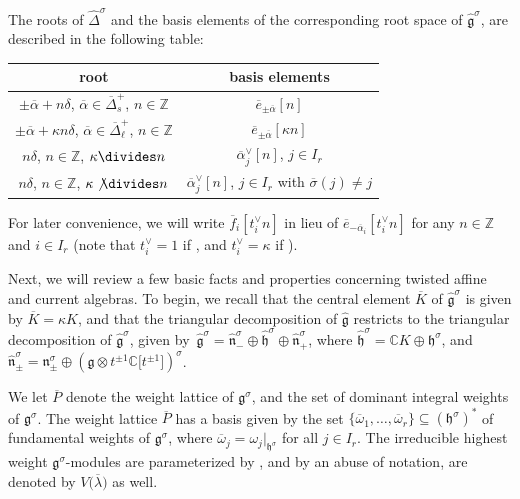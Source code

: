 \documentclass[pdftex]{sigma}
\numberwithin{equation}{section}
\begin{document}
The roots of $\widehat{\Delta}^{\sigma}$ and the basis elements of the corresponding root space of $\widehat{\mathfrak{g}}^{\sigma}$, are described in the following table:
\begin{center}\renewcommand{\arraystretch}{1.2}
 \begin{tabular}{|c|c|}
 \hline
 root & basis elements \\ \hline
 $\pm\overline{\alpha}+n\delta$, $\overline{\alpha}\in\overline{\Delta}_s^+$, $n\in\mathbb{Z}$ & $\overline{e}_{\pm\overline{\alpha}}[n]$ \\ \hline
 $\pm\overline{\alpha}+\kappa n\delta$, $\overline{\alpha}\in\overline{\Delta}_{\ell}^+$, $n\in\mathbb{Z}$ & $\overline{e}_{\pm\overline{\alpha}}[\kappa n]$ \\ \hline
 $n\delta$, $n\in\mathbb{Z}$, $\kappa\divides n$ & $\overline{\alpha}_j^{\vee}[n]$, $j\in I_r$ \\ \hline
 $n\delta$, $n\in\mathbb{Z}$, $\kappa\not\divides n$ & $\overline{\alpha}_j^{\vee}[n]$, $j\in I_r$ with $\overline{\sigma}(j)\neq j$ \\
 \hline
 \end{tabular}
\end{center}
For later convenience, we will write $\overline{f}_i[t_i^{\vee}n]$ in lieu of $\overline{e}_{-\overline{\alpha}_i}[t_i^{\vee}n]$ for any $n\in\mathbb{Z}$ and $i\in I_r$ \big(note that $t_i^{\vee}=1$ if , and $t_i^{\vee}=\kappa$ if \big).

Next, we will review a few basic facts and properties concerning twisted affine and current algebras. To begin, we recall that the central element $\overline{K}$ of $\widehat{\mathfrak{g}}^{\sigma}$ is given by $\overline{K}=\kappa K$, and that the triangular decomposition of $\widehat{\mathfrak{g}}$ restricts to the triangular decomposition of $\widehat{\mathfrak{g}}^{\sigma}$, given by~${\widehat{\mathfrak{g}}^{\sigma}=\widehat{\mathfrak{n}}_-^{\sigma}\oplus \widehat{\mathfrak{h}}^{\sigma}\oplus \widehat{\mathfrak{n}}_+^{\sigma}}$, where $\widehat{\mathfrak{h}}^{\sigma}= \mathbb{C}K\oplus\mathfrak{h}^{\sigma}$, and $\widehat{\mathfrak{n}}_{\pm}^{\sigma}=\mathfrak{n}_{\pm}^{\sigma} \oplus(\mathfrak{g}\otimes t^{\pm1}\mathbb{C}\bigl[t^{\pm1}\bigr]) ^{\sigma}$.

We let $\overline{P}$ denote the weight lattice of $\mathfrak{g}^{\sigma}$, and  the set of dominant integral weights of $\mathfrak{g}^{\sigma}$. The weight lattice $\overline{P}$ has a basis given by the set $\{\overline{\omega}_1,\dots, \overline{\omega}_r\}\subseteq(\mathfrak{h}^{\sigma})^*$ of fundamental weights of $\mathfrak{g}^{\sigma}$, where $\overline{\omega}_j=\omega_j|_{\mathfrak{h}^{\sigma}}$ for all $j\in I_r$. The irreducible highest weight $\mathfrak{g}^{\sigma}$-modules are parameterized by , and by an abuse of notation, are denoted by $V\bigl(\overline{\lambda}\bigr)$ as well.
\end{document}
